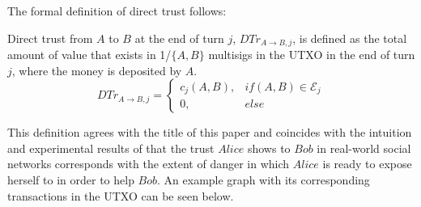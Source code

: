 \documentclass[11pt]{llncs}
\theoremstyle{definition}
\begin{document}
     The formal definition of direct trust follows:
     \begin{definition}
        Direct trust from $A$ to $B$ at the end of turn $j$, $DTr_{A \rightarrow B, j}$, is defined as the total amount of
        value that exists in 1/$\{A,B\}$ multisigs in the UTXO in the end of turn $j$, where the money is deposited by $A$.
        \begin{equation}
           DTr_{A \rightarrow B, j} =
              \begin{cases}
                 c_j\left(A, B\right), & if \left(A, B\right) \in \mathcal{E}_j \\
                 0, & else
              \end{cases}
        \end{equation}
     \end{definition}
     This definition agrees with the title of this paper and coincides with the intuition and experimental results of
     \cite{socialcollateral} that the trust $Alice$ shows to $Bob$ in real-world social networks corresponds with the extent
     of danger in which $Alice$ is ready to expose herself to in order to help $Bob$. An example graph with its corresponding
     transactions in the UTXO can be seen below.
\end{document}
